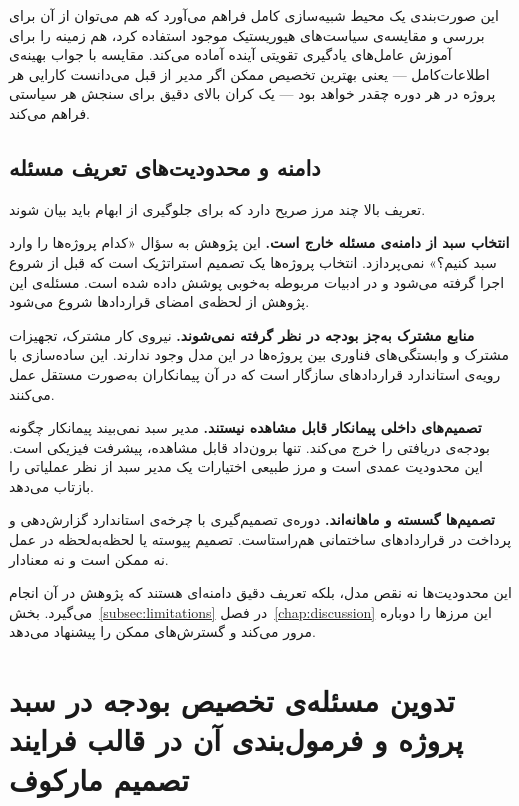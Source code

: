 این صورت‌بندی یک محیط شبیه‌سازی کامل فراهم می‌آورد که هم می‌توان
از آن برای بررسی و مقایسه‌ی سیاست‌های هیوریستیک موجود استفاده کرد،
هم زمینه را برای آموزش عامل‌های یادگیری تقویتی آینده آماده می‌کند.
مقایسه با جواب بهینه‌ی اطلاعات‌کامل — یعنی بهترین تخصیص ممکن اگر
مدیر از قبل می‌دانست کارایی هر پروژه در هر دوره چقدر خواهد بود —
یک کران بالای دقیق برای سنجش هر سیاستی فراهم می‌کند.

\subsection{دامنه و محدودیت‌های تعریف مسئله}

تعریف بالا چند مرز صریح دارد که برای جلوگیری از ابهام باید بیان شوند.

\textbf{انتخاب سبد از دامنه‌ی مسئله خارج است.} این پژوهش به سؤال
«کدام پروژه‌ها را وارد سبد کنیم؟» نمی‌پردازد. انتخاب پروژه‌ها یک
تصمیم استراتژیک است که قبل از شروع اجرا گرفته می‌شود و در ادبیات
مربوطه به‌خوبی پوشش داده شده است. مسئله‌ی این پژوهش از لحظه‌ی امضای
قراردادها شروع می‌شود.

\textbf{منابع مشترک به‌جز بودجه در نظر گرفته نمی‌شوند.} نیروی کار
مشترک، تجهیزات مشترک و وابستگی‌های فناوری بین پروژه‌ها در این مدل
وجود ندارند. این ساده‌سازی با رویه‌ی استاندارد قراردادهای 
سازگار است که در آن پیمانکاران به‌صورت مستقل عمل می‌کنند.

\textbf{تصمیم‌های داخلی پیمانکار قابل مشاهده نیستند.} مدیر سبد
نمی‌بیند پیمانکار چگونه بودجه‌ی دریافتی را خرج می‌کند. تنها
برون‌داد قابل مشاهده، پیشرفت فیزیکی است. این محدودیت عمدی است و
مرز طبیعی اختیارات یک مدیر سبد از نظر عملیاتی را بازتاب می‌دهد.

\textbf{تصمیم‌ها گسسته و ماهانه‌اند.} دوره‌ی تصمیم‌گیری با چرخه‌ی
استاندارد گزارش‌دهی و پرداخت در قراردادهای ساختمانی هم‌راستاست. تصمیم
پیوسته یا لحظه‌به‌لحظه در عمل نه ممکن است و نه معنادار.

این محدودیت‌ها نه نقص مدل، بلکه تعریف دقیق دامنه‌ای هستند که
پژوهش در آن انجام می‌گیرد. بخش~\ref{subsec:limitations} در
فصل~\ref{chap:discussion} این مرزها را دوباره مرور می‌کند و گسترش‌های
ممکن را پیشنهاد می‌دهد.

\section{تدوین مسئله‌ی تخصیص بودجه در سبد پروژه و فرمول‌بندی آن در قالب فرایند تصمیم مارکوف}

